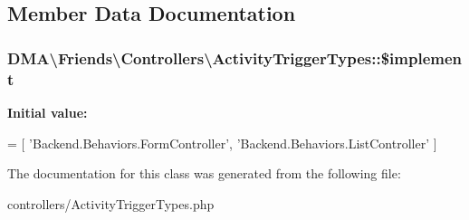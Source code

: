 \subsection{Member Data Documentation}
\hypertarget{classDMA_1_1Friends_1_1Controllers_1_1ActivityTriggerTypes_a7504906f92e023eb641a59fc21e2e07b}{
\subsubsection[{\$implement}]{\setlength{\rightskip}{0pt plus 5cm}D\-M\-A\textbackslash{}\-Friends\textbackslash{}\-Controllers\textbackslash{}\-Activity\-Trigger\-Types\-::\$implement}}\label{classDMA_1_1Friends_1_1Controllers_1_1ActivityTriggerTypes_a7504906f92e023eb641a59fc21e2e07b}
{\bfseries Initial value\-:}
\begin{DoxyCode}
= [
        \textcolor{stringliteral}{'Backend.Behaviors.FormController'},
        \textcolor{stringliteral}{'Backend.Behaviors.ListController'}
    ]
\end{DoxyCode}


The documentation for this class was generated from the following file\-:\begin{DoxyCompactItemize}
\item 
controllers/Activity\-Trigger\-Types.\-php\end{DoxyCompactItemize}
